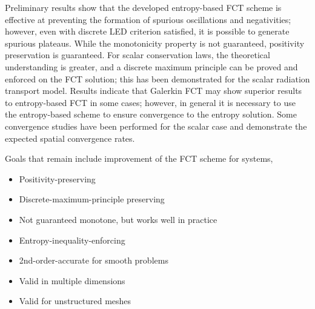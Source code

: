 Preliminary results show that the developed entropy-based FCT scheme
is effective at preventing the formation of spurious oscillations and
negativities; however, even with discrete LED criterion satisfied, it is
possible to generate spurious plateaus. While the monotonicity property is
not guaranteed, positivity preservation is guaranteed. For scalar conservation laws,
the theoretical understanding
is greater, and a discrete maximum principle can be proved and enforced
on the FCT solution; this has been demonstrated for the scalar radiation
transport model. Results indicate that Galerkin FCT may show superior
results to entropy-based FCT in some cases; however, in general it is
necessary to use the entropy-based scheme to ensure convergence to the
entropy solution.
Some convergence studies have been performed for the scalar case and
demonstrate the expected spatial convergence rates.

Goals that remain include improvement of the FCT scheme for systems,


    \begin{itemize}
      \item Positivity-preserving
      \item Discrete-maximum-principle preserving
      \item Not guaranteed monotone, but works well in practice
      \item Entropy-inequality-enforcing
      \item 2nd-order-accurate for smooth problems
      \item Valid in multiple dimensions
      \item Valid for unstructured meshes
    \end{itemize}

